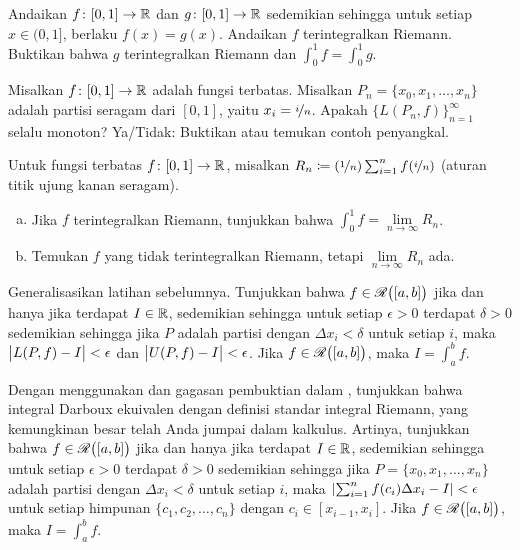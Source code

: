 \begin{exercise}
Andaikan $f \colon [0,1] \to {\mathbb{R}}$ dan $g \colon [0,1] \to {\mathbb{R}}$
sedemikian sehingga untuk setiap $x \in (0,1]$,
berlaku $f(x) = g(x)$.  Andaikan $f$ terintegralkan Riemann. 
Buktikan bahwa $g$ terintegralkan Riemann dan $\int_{0}^1 f = \int_{0}^1 g$.
\end{exercise}

\begin{exercise}
Misalkan $f \colon [0,1] \to {\mathbb{R}}$ adalah fungsi terbatas.
Misalkan $P_n = \{ x_0,x_1,\ldots,x_n \}$ adalah partisi seragam dari $[0,1]$,
yaitu $x_i = \nicefrac{i}{n}$.  Apakah $\bigl\{ L(P_n,f) \bigr\}_{n=1}^\infty$
selalu monoton?  Ya/Tidak: Buktikan atau temukan contoh penyangkal.
\end{exercise}

\begin{exercise}[Menantang]
Untuk fungsi terbatas $f \colon [0,1] \to {\mathbb{R}}$, misalkan
$R_n \coloneqq (\nicefrac{1}{n})\sum_{i=1}^n f(\nicefrac{i}{n})$ (aturan
titik ujung kanan seragam).
\begin{enumerate}[a)]
\item
Jika $f$ terintegralkan Riemann, tunjukkan bahwa $\int_0^1 f = \lim\limits_{n\to\infty} R_n$.
\item
Temukan $f$ yang tidak terintegralkan Riemann, tetapi $\lim\limits_{n\to\infty} R_n$ ada.
\end{enumerate}
\end{exercise}

\begin{exercise}[Menantang] \label{exercise:riemannintdarboux}
Generalisasikan latihan sebelumnya.
Tunjukkan bahwa $f \in {\mathscr{R}}\bigl([a,b]\bigr)$ jika dan hanya jika terdapat $I \in {\mathbb{R}}$,
sedemikian sehingga untuk setiap $\epsilon > 0$ terdapat
$\delta > 0$ sedemikian sehingga jika $P$ adalah partisi dengan $\Delta x_i < \delta$
untuk setiap $i$, maka
$\bigl\lvert {L(P,f) - I} \bigr\rvert < \epsilon$ dan
$\bigl\lvert {U(P,f) - I} \bigr\rvert < \epsilon$.  Jika $f \in {\mathscr{R}}\bigl([a,b]\bigr)$, maka $I = \int_a^b f$.
\end{exercise}

\begin{exercise}
Dengan menggunakan  dan gagasan
pembuktian dalam , tunjukkan bahwa 
integral Darboux ekuivalen dengan definisi standar
integral Riemann, yang kemungkinan besar telah Anda jumpai dalam kalkulus.  Artinya,
tunjukkan bahwa
$f \in {\mathscr{R}}\bigl([a,b]\bigr)$ jika dan hanya jika terdapat $I \in {\mathbb{R}}$,
sedemikian sehingga untuk setiap $\epsilon > 0$ terdapat
$\delta > 0$ sedemikian sehingga jika $P = \{ x_0,x_1,\ldots,x_n \}$
adalah partisi dengan $\Delta x_i < \delta$
untuk setiap $i$, maka
$\left\lvert {\sum_{i=1}^n f(c_i) \Delta x_i - I} \right\rvert < \epsilon$ untuk setiap himpunan
$\{ c_1,c_2,\ldots,c_n \}$ dengan $c_i \in [x_{i-1},x_i]$.
Jika $f \in {\mathscr{R}}\bigl([a,b]\bigr)$, maka $I = \int_a^b f$.
\end{exercise}


